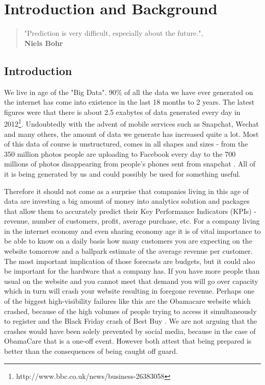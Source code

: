 \documentclass[minf,twoside,singlespacing,parskip,frontabs,notimes,12pt]{infthesis} %
\begin{document}
\tableofcontents


\chapter{Introduction and Background}

\begin{quotation}
"Prediction is very difficult, especially about the future.", \\
\textbf{Niels Bohr}
\end{quotation}

\section{Introduction}

We live in age of the "Big Data". 90\% of all the data we have ever generated on the internet has come into existence in the last 18 months to 2 years. The latest figures were that there is about 2.5 exabytes of data generated every day in 2012\footnote{http://www.bbc.co.uk/news/business-26383058}. Undoubtedly with the advent of mobile services such as Snapchat, Wechat and many others, the amount of data we generate has increased quite a lot. Most of this data of course is unstructured, comes in all shapes and sizes - from the 350 million photos people are uploading to Facebook every day \cite{InternetOrgWhitepaper} to the 700 millions of photos disappearing from people's phones sent from snapchat \cite{snapchat}. All of it is being generated by us and could possibly be used for something useful. 

Therefore it should not come as a surprise that  companies living in this age of data are investing a big amount of money into analytics solution and packages that allow them to accurately predict their Key Performance Indicators (KPIs) - revenue, number of customers, profit, average purchase, etc. For a company living in the internet economy and even sharing economy age it is of vital importance to be able to know on a daily basis how many customers you are expecting on the website tomorrow and a ballpark estimate of the average revenue per customer. The most important implication of those forecasts are budgets, but it could also be important for the hardware that a company has. If you have more people than usual on the website and you cannot meet that demand you will go over capacity which in turn will crash your website resulting in foregone revenue. Perhaps one of the biggest high-visibility failures like this are the Obamacare website which crashed, because of the high volumes of people trying to access it simultaneously to register \cite{obcare} and the Black Friday crash of Best Buy \cite{bestbuy}. We are not arguing that the crashes would have been solely prevented by social media, because in the case of ObamaCare that is a one-off event. However both attest that being prepared is better than the consequences of being caught off guard. 
\end{document}
